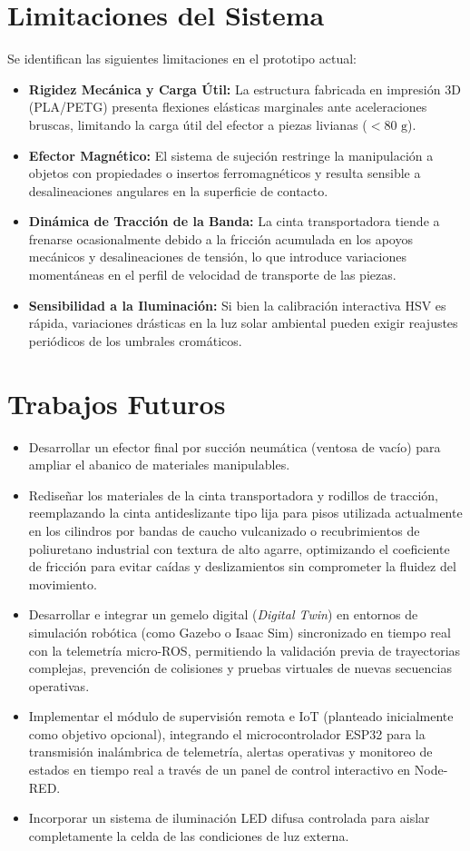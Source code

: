 \documentclass[12pt, a4paper]{report}
\begin{document}
\section{Limitaciones del Sistema}
Se identifican las siguientes limitaciones en el prototipo actual:
\begin{itemize}
    \item \textbf{Rigidez Mecánica y Carga Útil:} La estructura fabricada en impresión 3D (PLA/PETG) presenta flexiones elásticas marginales ante aceleraciones bruscas, limitando la carga útil del efector a piezas livianas ($< 80\text{ g}$).
    \item \textbf{Efector Magnético:} El sistema de sujeción restringe la manipulación a objetos con propiedades o insertos ferromagnéticos y resulta sensible a desalineaciones angulares en la superficie de contacto.
    \item \textbf{Dinámica de Tracción de la Banda:} La cinta transportadora tiende a frenarse ocasionalmente debido a la fricción acumulada en los apoyos mecánicos y desalineaciones de tensión, lo que introduce variaciones momentáneas en el perfil de velocidad de transporte de las piezas.
    \item \textbf{Sensibilidad a la Iluminación:} Si bien la calibración interactiva HSV es rápida, variaciones drásticas en la luz solar ambiental pueden exigir reajustes periódicos de los umbrales cromáticos.
\end{itemize}

\section{Trabajos Futuros}
\begin{itemize}
    \item Desarrollar un efector final por succión neumática (ventosa de vacío) para ampliar el abanico de materiales manipulables.
    \item Rediseñar los materiales de la cinta transportadora y rodillos de tracción, reemplazando la cinta antideslizante tipo lija para pisos utilizada actualmente en los cilindros por bandas de caucho vulcanizado o recubrimientos de poliuretano industrial con textura de alto agarre, optimizando el coeficiente de fricción para evitar caídas y deslizamientos sin comprometer la fluidez del movimiento.
    \item Desarrollar e integrar un gemelo digital (\textit{Digital Twin}) en entornos de simulación robótica (como Gazebo o Isaac Sim) sincronizado en tiempo real con la telemetría micro-ROS, permitiendo la validación previa de trayectorias complejas, prevención de colisiones y pruebas virtuales de nuevas secuencias operativas.
    \item Implementar el módulo de supervisión remota e IoT (planteado inicialmente como objetivo opcional), integrando el microcontrolador ESP32 para la transmisión inalámbrica de telemetría, alertas operativas y monitoreo de estados en tiempo real a través de un panel de control interactivo en Node-RED.
    \item Incorporar un sistema de iluminación LED difusa controlada para aislar completamente la celda de las condiciones de luz externa.
\end{itemize}
\end{document}
